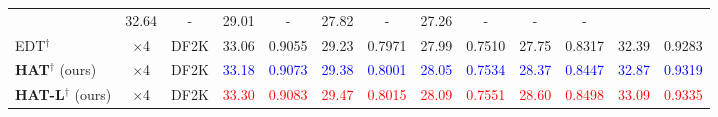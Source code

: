 \begin{table*}[!htbp]
\begin{center}
\begin{adjustbox}{width=\linewidth}
\begin{tabular}{|l|c|c|c|c|c|c|c|c|c|c|c|c|}
& {32.64}
& {-}
& {29.01}
& {-}
& {27.82}
& {-}
& {27.26}
& {-}
& {-}
& {-}
\\
EDT$^\dagger$~\cite{DBLP:journals/corr/abs-2112-10175} & $\times$4 & DF2K %
& {\color[HTML]{00BF01} 33.06}
& {0.9055}
& {\color[HTML]{00BF01} 29.23}
& {0.7971}
& {27.99}
& 0.7510
& 27.75
& 0.8317
& 32.39
& 0.9283
\\
\textbf{HAT}$^\dagger$ (ours) & $\times$4 & DF2K %
& \textcolor{blue}{33.18}
& \textcolor{blue}{0.9073}
& \textcolor{blue}{29.38}
& \textcolor{blue}{0.8001}
& \textcolor{blue}{28.05}
& \textcolor{blue}{0.7534}
& \textcolor{blue}{28.37}
& \textcolor{blue}{0.8447}
& \textcolor{blue}{32.87}
& \textcolor{blue}{0.9319}
\\
\textbf{HAT-L}$^\dagger$ (ours) & $\times$4 & DF2K %
& \textcolor{red}{33.30}
& \textcolor{red}{0.9083}
& \textcolor{red}{29.47}
& \textcolor{red}{0.8015}
& \textcolor{red}{28.09}
& \textcolor{red}{0.7551}
& \textcolor{red}{28.60}
& \textcolor{red}{0.8498}
& \textcolor{red}{33.09}
& \textcolor{red}{0.9335}
\\
\hline             
\end{tabular}
\end{adjustbox}
\end{center}
\end{table*}

